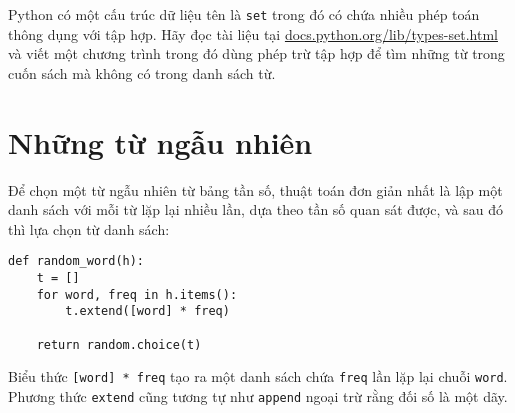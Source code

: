 \documentclass[11pt]{book}
\begin{document}
\begin{ex}


Python có một cấu trúc dữ liệu tên là {\tt set} trong đó có chứa nhiều
phép toán thông dụng với tập hợp. Hãy đọc tài liệu tại
\url{docs.python.org/lib/types-set.html} và viết một chương trình
trong đó dùng phép trừ tập hợp để tìm những từ trong cuốn sách mà
không có trong danh sách từ.
\end{ex}


\section{Những từ ngẫu nhiên}
\label{randomwords}


Để chọn một từ ngẫu nhiên từ bảng tần số, thuật toán đơn giản nhất
là lập một danh sách với mỗi từ lặp lại nhiều lần, dựa theo tần số
quan sát được, và sau đó thì lựa chọn từ danh sách:

\beforeverb
\begin{verbatim}
def random_word(h):
    t = []
    for word, freq in h.items():
        t.extend([word] * freq)

    return random.choice(t)
\end{verbatim}
\afterverb
%
Biểu thức  {\tt [word] * freq} tạo ra một danh sách chứa {\tt freq}
lần lặp lại chuỗi {\tt word}.  Phương thức {\tt extend}
cũng tương tự như {\tt append} ngoại trừ rằng đối số là một dãy.
\end{document}
